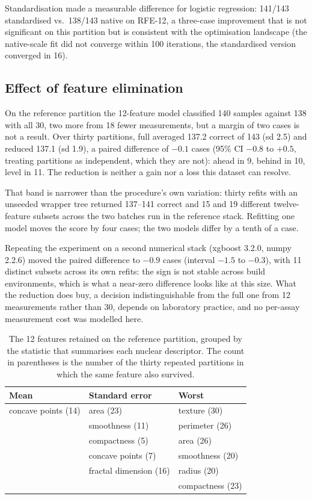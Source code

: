 \documentclass[review,12pt]{elsarticle}
\renewcommand{\arraystretch}{1.12}
\begin{document}
Standardisation made a measurable difference for logistic regression: 141/143 standardised vs.\ 138/143 native on RFE-12, a three-case improvement that is not significant on this partition but is consistent with the optimisation landscape (the native-scale fit did not converge within 100 iterations, the standardised version converged in 16).

\subsection{Effect of feature elimination}
\label{sec:elim}

On the reference partition the 12-feature model classified 140 samples against 138 with all 30, two more from 18 fewer measurements, but a margin of two cases is not a result. Over thirty partitions, full averaged 137.2 correct of 143 (sd 2.5) and reduced 137.1 (sd 1.9), a paired difference of $-0.1$ cases (95\% CI $-0.8$ to $+0.5$, treating partitions as independent, which they are not): ahead in 9, behind in 10, level in 11. The reduction is neither a gain nor a loss this dataset can resolve.

That band is narrower than the procedure's own variation: thirty refits with an unseeded wrapper tree returned 137--141 correct and 15 and 19 different twelve-feature subsets across the two batches run in the reference stack. Refitting one model moves the score by four cases; the two models differ by a tenth of a case.

Repeating the experiment on a second numerical stack (xgboost 3.2.0, numpy 2.2.6) moved the paired difference to $-0.9$ cases (interval $-1.5$ to $-0.3$), with 11 distinct subsets across its own refits: the sign is not stable across build environments, which is what a near-zero difference looks like at this size. What the reduction does buy, a decision indistinguishable from the full one from 12 measurements rather than 30, depends on laboratory practice, and no per-assay measurement cost was modelled here.

\begin{table}[ht!]
\centering
\caption{The 12 features retained on the reference partition, grouped by the statistic that summarises each nuclear descriptor. The count in parentheses is the number of the thirty repeated partitions in which the same feature also survived.}
\label{tab:rfe}
\renewcommand{\arraystretch}{1.12}
\begin{tabular}{lll}
\hline
Mean & Standard error & Worst\\
\hline
concave points (14) & area (23) & texture (30)\\
                    & smoothness (11) & perimeter (26)\\
                    & compactness (5) & area (26)\\
                    & concave points (7) & smoothness (20)\\
                    & fractal dimension (16) & radius (20)\\
                    & & compactness (23)\\
\hline
\end{tabular}
\end{table}
\end{document}
